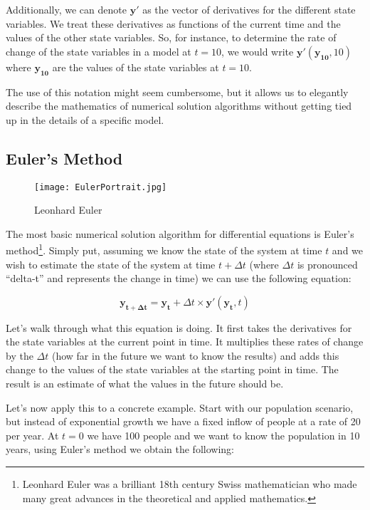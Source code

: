 \documentclass[]{memoir}
\makeatletter
\def\maxwidth{\ifdim\Gin@nat@width>\linewidth\linewidth
\else\Gin@nat@width\fi}
\let\Oldincludegraphics\includegraphics
\renewcommand{\includegraphics}[1]{\Oldincludegraphics[width=\maxwidth]{#1}}
\makeatother
\begin{document}
Additionally, we can denote $\mathbf{y'}$ as the vector of derivatives
for the different state variables. We treat these derivatives as
functions of the current time and the values of the other state
variables. So, for instance, to determine the rate of change of the
state variables in a model at $t=10$, we would write
$\mathbf{y'}(\mathbf{y_{10}}, 10)$ where $\mathbf{y_{10}}$ are the
values of the state variables at $t=10$.

The use of this notation might seem cumbersome, but it allows us to
elegantly describe the mathematics of numerical solution algorithms
without getting tied up in the details of a specific model.

\subsection{Euler's Method}

\begin{figure}[htbp]
\centering
\texttt{[image: EulerPortrait.jpg]}
\caption{Leonhard Euler}
\end{figure}

The most basic numerical solution algorithm for differential equations
is Euler's method\footnote{Leonhard Euler was a brilliant 18th century
  Swiss mathematician who made many great advances in the theoretical
  and applied mathematics.}. Simply put, assuming we know the state of
the system at time $t$ and we wish to estimate the state of the system
at time $t+\Delta t$ (where $\Delta t$ is pronounced ``delta-t'' and
represents the change in time) we can use the following equation:

\[ \mathbf{y_{t+\Delta t}} = \mathbf{y_{t}} + \Delta t \times \mathbf{y'}(\mathbf{y_t}, t) \]

Let's walk through what this equation is doing. It first takes the
derivatives for the state variables at the current point in time. It
multiplies these rates of change by the $\Delta t$ (how far in the
future we want to know the results) and adds this change to the values
of the state variables at the starting point in time. The result is an
estimate of what the values in the future should be.

Let's now apply this to a concrete example. Start with our population
scenario, but instead of exponential growth we have a fixed inflow of
people at a rate of 20 per year. At $t=0$ we have 100 people and we want
to know the population in 10 years, using Euler's method we obtain the
following:
\end{document}
